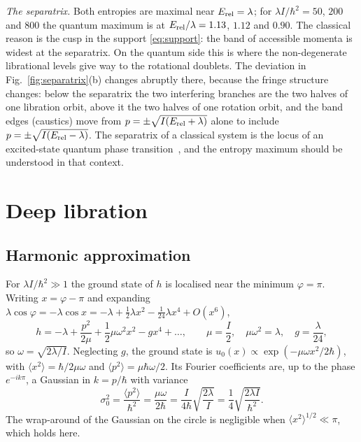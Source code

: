 \documentclass[preprint,12pt]{elsarticle}
\newcommand{\Erel}{E_{\rm rel}}
\begin{document}
\emph{The separatrix.} Both entropies are maximal near $\Erel=\lambda$; for
$\lambda I/\hbar^{2}=50$, $200$ and $800$ the quantum maximum is at
$\Erel/\lambda=1.13$, $1.12$ and $0.90$. The classical reason is the cusp in the
support \eqref{eq:support}: the band of accessible momenta is widest at the
separatrix. On the quantum side this is where the non-degenerate librational
levels give way to the rotational doublets. The deviation in
Fig.~\ref{fig:separatrix}(b) changes abruptly there, because the fringe
structure changes: below the separatrix the two interfering branches are the two
halves of one libration orbit, above it the two halves of one rotation orbit,
and the band edges (caustics) move from $p=\pm\sqrt{I(\Erel+\lambda)}$ alone to
include $p=\pm\sqrt{I(\Erel-\lambda)}$. The separatrix of a classical system is
the locus of an excited-state quantum phase transition~\cite{CaprioCejnarIachello,
Stransky,Cejnar}, and the entropy maximum should be understood in that context.

\section{Deep libration}
\label{sec:libration}

\subsection{Harmonic approximation}

For $\lambda I/\hbar^{2}\gg1$ the ground state of $h$ is localised near the
minimum $\varphi=\pi$. Writing $x=\varphi-\pi$ and expanding
$\lambda\cos\varphi=-\lambda\cos x=-\lambda+\tfrac12\lambda x^{2}
-\tfrac{1}{24}\lambda x^{4}+O(x^{6})$,
\begin{equation}
h=-\lambda+\frac{p^{2}}{2\mu}+\frac12\mu\omega^{2}x^{2}-gx^{4}+\dots,\qquad
\mu=\frac{I}{2},\quad \mu\omega^{2}=\lambda,\quad g=\frac{\lambda}{24},
\label{eq:hho}
\end{equation}
so $\omega=\sqrt{2\lambda/I}$. Neglecting $g$, the ground state is
$u_{0}(x)\propto\exp(-\mu\omega x^{2}/2\hbar)$, with
$\langle x^{2}\rangle=\hbar/2\mu\omega$ and $\langle p^{2}\rangle=\mu\hbar\omega/2$.
Its Fourier coefficients are, up to the phase $e^{-ik\pi}$, a Gaussian in
$k=p/\hbar$ with variance
\begin{equation}
\sigma_{0}^{2}=\frac{\langle p^{2}\rangle}{\hbar^{2}}=\frac{\mu\omega}{2\hbar}
=\frac{I}{4\hbar}\sqrt{\frac{2\lambda}{I}}=\frac14\sqrt{\frac{2\lambda I}{\hbar^{2}}} .
\end{equation}
The wrap-around of the Gaussian on the circle is negligible when
$\langle x^{2}\rangle^{1/2}\ll\pi$, which holds here.
\end{document}
